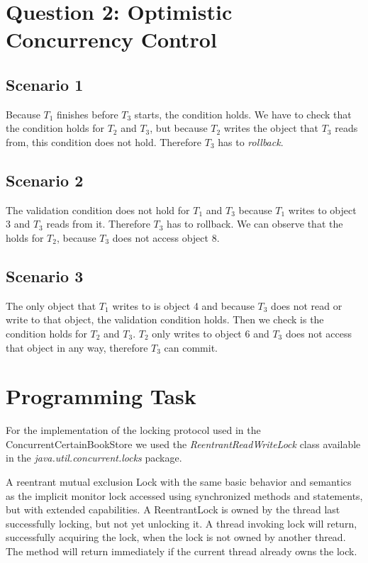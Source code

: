 \documentclass{article}      %
\begin{document}
\section*{Question 2: Optimistic Concurrency Control}

\subsection*{Scenario 1}

Because $T_1$ finishes before $T_3$ starts, the  condition holds. We have to check that the  condition holds for $T_2$ and $T_3$, but because $T_2$ writes the object that $T_3$ reads from, this condition does not hold. Therefore $T_3$ has to \emph{rollback}.

\subsection*{Scenario 2}

The  validation condition does not hold for $T_1$ and $T_3$ because $T_1$ writes to object 3 and $T_3$ reads from it. Therefore $T_3$ has to rollback. We can observe that the  holds for $T_2$, because $T_3$ does not access object 8.

\subsection*{Scenario 3}

The only object that $T_1$ writes to is object 4 and because $T_3$ does not read or write to that object, the  validation condition holds. Then we check is the  condition holds for $T_2$ and $T_3$. $T_2$ only writes to object 6 and $T_3$ does not access that object in any way, therefore $T_3$ can commit.

\section*{Programming Task}

For the implementation of the locking protocol used in the ConcurrentCertainBookStore we used the \emph{ReentrantReadWriteLock} class available in the \emph{java.util.concurrent.locks} package. 

A reentrant mutual exclusion Lock with the same basic behavior and semantics as the implicit monitor lock accessed using synchronized methods and statements, but with extended capabilities. A ReentrantLock is owned by the thread last successfully locking, but not yet unlocking it. A thread invoking lock will return, successfully acquiring the lock, when the lock is not owned by another thread. The method will return immediately if the current thread already owns the lock.
\end{document}
